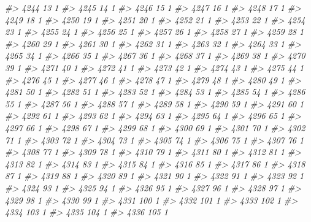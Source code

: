 \documentclass[]{article}
\newenvironment{Shaded}{\begin{snugshade}}{\end{snugshade}}
\newcommand{\CommentTok}[1]{\textcolor[rgb]{0.56,0.35,0.01}{\textit{#1}}}
\begin{document}
\begin{Shaded}
\begin{Highlighting}[]
\CommentTok{#> 4244  13  1}
\CommentTok{#> 4245  14  1}
\CommentTok{#> 4246  15  1}
\CommentTok{#> 4247  16  1}
\CommentTok{#> 4248  17  1}
\CommentTok{#> 4249  18  1}
\CommentTok{#> 4250  19  1}
\CommentTok{#> 4251  20  1}
\CommentTok{#> 4252  21  1}
\CommentTok{#> 4253  22  1}
\CommentTok{#> 4254  23  1}
\CommentTok{#> 4255  24  1}
\CommentTok{#> 4256  25  1}
\CommentTok{#> 4257  26  1}
\CommentTok{#> 4258  27  1}
\CommentTok{#> 4259  28  1}
\CommentTok{#> 4260  29  1}
\CommentTok{#> 4261  30  1}
\CommentTok{#> 4262  31  1}
\CommentTok{#> 4263  32  1}
\CommentTok{#> 4264  33  1}
\CommentTok{#> 4265  34  1}
\CommentTok{#> 4266  35  1}
\CommentTok{#> 4267  36  1}
\CommentTok{#> 4268  37  1}
\CommentTok{#> 4269  38  1}
\CommentTok{#> 4270  39  1}
\CommentTok{#> 4271  40  1}
\CommentTok{#> 4272  41  1}
\CommentTok{#> 4273  42  1}
\CommentTok{#> 4274  43  1}
\CommentTok{#> 4275  44  1}
\CommentTok{#> 4276  45  1}
\CommentTok{#> 4277  46  1}
\CommentTok{#> 4278  47  1}
\CommentTok{#> 4279  48  1}
\CommentTok{#> 4280  49  1}
\CommentTok{#> 4281  50  1}
\CommentTok{#> 4282  51  1}
\CommentTok{#> 4283  52  1}
\CommentTok{#> 4284  53  1}
\CommentTok{#> 4285  54  1}
\CommentTok{#> 4286  55  1}
\CommentTok{#> 4287  56  1}
\CommentTok{#> 4288  57  1}
\CommentTok{#> 4289  58  1}
\CommentTok{#> 4290  59  1}
\CommentTok{#> 4291  60  1}
\CommentTok{#> 4292  61  1}
\CommentTok{#> 4293  62  1}
\CommentTok{#> 4294  63  1}
\CommentTok{#> 4295  64  1}
\CommentTok{#> 4296  65  1}
\CommentTok{#> 4297  66  1}
\CommentTok{#> 4298  67  1}
\CommentTok{#> 4299  68  1}
\CommentTok{#> 4300  69  1}
\CommentTok{#> 4301  70  1}
\CommentTok{#> 4302  71  1}
\CommentTok{#> 4303  72  1}
\CommentTok{#> 4304  73  1}
\CommentTok{#> 4305  74  1}
\CommentTok{#> 4306  75  1}
\CommentTok{#> 4307  76  1}
\CommentTok{#> 4308  77  1}
\CommentTok{#> 4309  78  1}
\CommentTok{#> 4310  79  1}
\CommentTok{#> 4311  80  1}
\CommentTok{#> 4312  81  1}
\CommentTok{#> 4313  82  1}
\CommentTok{#> 4314  83  1}
\CommentTok{#> 4315  84  1}
\CommentTok{#> 4316  85  1}
\CommentTok{#> 4317  86  1}
\CommentTok{#> 4318  87  1}
\CommentTok{#> 4319  88  1}
\CommentTok{#> 4320  89  1}
\CommentTok{#> 4321  90  1}
\CommentTok{#> 4322  91  1}
\CommentTok{#> 4323  92  1}
\CommentTok{#> 4324  93  1}
\CommentTok{#> 4325  94  1}
\CommentTok{#> 4326  95  1}
\CommentTok{#> 4327  96  1}
\CommentTok{#> 4328  97  1}
\CommentTok{#> 4329  98  1}
\CommentTok{#> 4330  99  1}
\CommentTok{#> 4331 100  1}
\CommentTok{#> 4332 101  1}
\CommentTok{#> 4333 102  1}
\CommentTok{#> 4334 103  1}
\CommentTok{#> 4335 104  1}
\CommentTok{#> 4336 105  1}

\end{Highlighting}
\end{Shaded}
\end{document}

